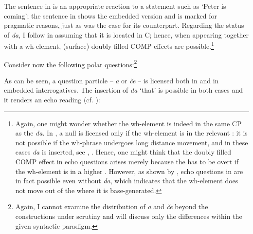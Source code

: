 \documentclass[output=paper,modfonts, hidelinks, newtxmath]{langscibook}
\begin{document}
 
\noindent The sentence in  is an appropriate reaction to a statement such as `Peter is coming'; the sentence in  shows the embedded version and is marked for pragmatic reasons, just as was the case for its  counterpart. Regarding the status of \textit{da}, I follow \citet{hladnik2010} in assuming that it is located in C; hence, when appearing together with a wh-element, (surface) doubly filled COMP effects are possible.\footnote{Again, one might wonder whether the wh-element is indeed in the same CP as the  \textit{da}. In , a null  is licensed only if the wh-element is in the relevant : it is not possible if the wh-phrase undergoes long distance movement, and in these cases \textit{da} is inserted, see \citet{golden1997}, \citet{marusic2008fdsl}. Hence, one might think that the doubly filled COMP effect in echo questions arises merely because the  has to be overt if the wh-element is in a higher . However, as shown by \citet{mismastoappear}, echo questions in  are in fact possible even without \textit{da}, which indicates that the wh-element does not move out of the  where it is base-generated.}

Consider now the following polar questions:\footnote{Again, I cannot examine the distribution of \textit{a} and \textit{če} beyond the constructions under scrutiny and will discuss only the differences within the given syntactic paradigm.}

\ea
	\z
\z

\noindent As can be seen, a question particle -- \textit{a} or \textit{če} -- is licensed both in  and in embedded interrogatives. The insertion of \textit{da} `that' is possible in both cases and it renders an echo reading (cf. \citealt{hladnik2010}):

\ea
	\z
\z
\end{document}
